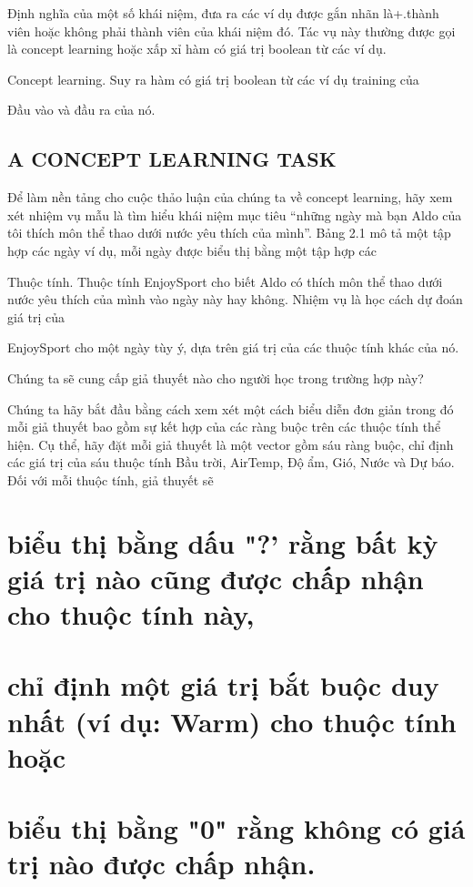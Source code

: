 Định nghĩa của một số khái niệm, đưa ra các ví dụ được gắn nhãn là+.thành viên hoặc không phải thành viên của khái niệm đó. Tác vụ này thường được gọi là concept learning hoặc xấp xỉ hàm có giá trị boolean từ các ví dụ.

Concept learning. Suy ra hàm có giá trị boolean từ các ví dụ training của

Đầu vào và đầu ra của nó.

\subsection{A CONCEPT LEARNING TASK}

Để làm nền tảng cho cuộc thảo luận của chúng ta về concept learning, hãy xem xét nhiệm vụ mẫu là tìm hiểu khái niệm mục tiêu “những ngày mà bạn Aldo của tôi thích môn thể thao dưới nước yêu thích của mình”. Bảng 2.1 mô tả một tập hợp các ngày ví dụ, mỗi ngày được biểu thị bằng một tập hợp các

Thuộc tính. Thuộc tính EnjoySport cho biết Aldo có thích môn thể thao dưới nước yêu thích của mình vào ngày này hay không. Nhiệm vụ là học cách dự đoán giá trị của

EnjoySport cho một ngày tùy ý, dựa trên giá trị của các thuộc tính khác của nó.

Chúng ta sẽ cung cấp giả thuyết nào cho người học trong trường hợp này?

Chúng ta hãy bắt đầu bằng cách xem xét một cách biểu diễn đơn giản trong đó mỗi giả thuyết bao gồm sự kết hợp của các ràng buộc trên các thuộc tính thể hiện. Cụ thể, hãy đặt mỗi giả thuyết là một vector gồm sáu ràng buộc, chỉ định các giá trị của sáu thuộc tính Bầu trời, AirTemp, Độ ẩm, Gió, Nước và Dự báo. Đối với mỗi thuộc tính, giả thuyết sẽ

\section{biểu thị bằng dấu "?' rằng bất kỳ giá trị nào cũng được chấp nhận cho thuộc tính này,}

\section{chỉ định một giá trị bắt buộc duy nhất (ví dụ: Warm) cho thuộc tính hoặc}

\section{biểu thị bằng "0" rằng không có giá trị nào được chấp nhận.}

